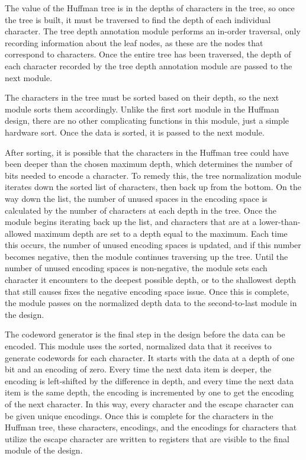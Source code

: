 \documentclass[doublespace,nopageskip]{VTthesis}
\begin{document}
The value of the Huffman tree is in the depths of characters in the tree, so once the tree is built, it must be traversed to find the depth of each individual character. The tree depth annotation module performs an in-order traversal, only recording information about the leaf nodes, as these are the nodes that correspond to characters. Once the entire tree has been traversed, the depth of each character recorded by the tree depth annotation module are passed to the next module.

The characters in the tree must be sorted based on their depth, so the next module sorts them accordingly. Unlike the first sort module in the Huffman design, there are no other complicating functions in this module, just a simple hardware sort. Once the data is sorted, it is passed to the next module.

After sorting, it is possible that the characters in the Huffman tree could have been deeper than the chosen maximum depth, which determines the number of bits needed to encode a character. To remedy this, the tree normalization module iterates down the sorted list of characters, then back up from the bottom. On the way down the list, the number of unused spaces in the encoding space is calculated by the number of characters at each depth in the tree. Once the module begins iterating back up the list, and characters that are at a lower-than-allowed maximum depth are set to a depth equal to the maximum. Each time this occurs, the number of unused encoding spaces is updated, and if this number becomes negative, then the module continues traversing up the tree. Until the number of unused encoding spaces is non-negative, the module sets each character it encounters to the deepest possible depth, or to the shallowest depth that still causes fixes the negative encoding space issue. Once this is complete, the module passes on the normalized depth data to the second-to-last module in the design.

The codeword generator is the final step in the design before the data can be encoded. This module uses the sorted, normalized data that it receives to generate codewords for each character. It starts with the data at a depth of one bit and an encoding of zero. Every time the next data item is deeper, the encoding is left-shifted by the difference in depth, and every time the next data item is the same depth, the encoding is incremented by one to get the encoding of the next character. In this way, every character and the escape character can be given unique encodings. Once this is complete for the characters in the Huffman tree, these characters, encodings, and the encodings for characters that utilize the escape character are written to registers that are visible to the final module of the design.
\end{document}

